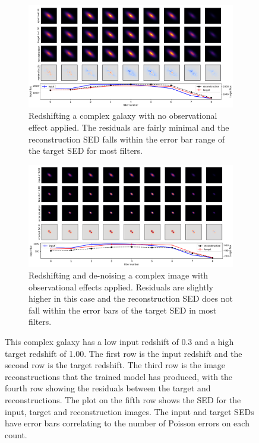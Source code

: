 \documentclass[fleqn,usenatbib]{mnras}
\begin{document}
\begin{figure}

    \begin{subfigure}[b]{2\columnwidth}
        \centering
	    \includegraphics[width=\columnwidth]{Figures/bd-standard-low-high.png}
        \caption{Redshifting a complex galaxy with no observational effect applied. The residuals are fairly minimal and the reconstruction SED falls within the error bar range of the target SED for most filters.}
        \label{fig:complex-standard-low-high}
    \end{subfigure}
    
    \begin{subfigure}[b]{2\columnwidth}
        \centering
	    \includegraphics[width=\columnwidth]{Figures/bd-noisy-low-high.png}
        \caption{Redshifting and de-noising a complex image with observational effects applied. Residuals are slightly higher in this case and the reconstruction SED does not fall within the error bars of the target SED in most filters.}
        \label{fig:complex-noisy-low-high}
    \end{subfigure}
    
    \caption{This complex galaxy has a low input redshift of 0.3 and a high target redshift of 1.00. The first row is the input redshift and the second row is the target redshift. The third row is the image reconstructions that the trained model has produced, with the fourth row showing the residuals between the target and reconstructions. The plot on the fifth row shows the SED for the input, target and reconstruction images. The input and target SEDs have error bars correlating to the number of Poisson errors on each count.}
    \label{fig:complex galaxy results plots redshift}

\end{figure}
\end{document}
